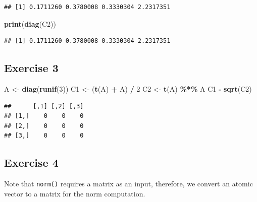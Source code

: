 \documentclass[
]{book}
\newenvironment{Shaded}{\begin{snugshade}}{\end{snugshade}}
\newcommand{\DecValTok}[1]{\textcolor[rgb]{0.00,0.00,0.81}{#1}}
\newcommand{\KeywordTok}[1]{\textcolor[rgb]{0.13,0.29,0.53}{\textbf{#1}}}
\newcommand{\NormalTok}[1]{#1}
\newcommand{\OperatorTok}[1]{\textcolor[rgb]{0.81,0.36,0.00}{\textbf{#1}}}
\newcommand{\StringTok}[1]{\textcolor[rgb]{0.31,0.60,0.02}{#1}}
\begin{document}
\begin{verbatim}
## [1] 0.1711260 0.3780008 0.3330304 2.2317351
\end{verbatim}

\begin{Shaded}
\begin{Highlighting}[]
\KeywordTok{print}\NormalTok{(}\KeywordTok{diag}\NormalTok{(C2))}
\end{Highlighting}
\end{Shaded}

\begin{verbatim}
## [1] 0.1711260 0.3780008 0.3330304 2.2317351
\end{verbatim}

\hypertarget{exercise-3-2}{%
\subsection*{Exercise 3}\label{exercise-3-2}}

\begin{Shaded}
\begin{Highlighting}[]
\NormalTok{A \textless{}{-}}\StringTok{ }\KeywordTok{diag}\NormalTok{(}\KeywordTok{runif}\NormalTok{(}\DecValTok{3}\NormalTok{))}
\NormalTok{C1 \textless{}{-}}\StringTok{ }\NormalTok{(}\KeywordTok{t}\NormalTok{(A) }\OperatorTok{+}\StringTok{ }\NormalTok{A) }\OperatorTok{/}\StringTok{ }\DecValTok{2}
\NormalTok{C2 \textless{}{-}}\StringTok{ }\KeywordTok{t}\NormalTok{(A) }\OperatorTok{\%*\%}\StringTok{ }\NormalTok{A}
\NormalTok{C1 }\OperatorTok{{-}}\StringTok{ }\KeywordTok{sqrt}\NormalTok{(C2)}
\end{Highlighting}
\end{Shaded}

\begin{verbatim}
##      [,1] [,2] [,3]
## [1,]    0    0    0
## [2,]    0    0    0
## [3,]    0    0    0
\end{verbatim}

\hypertarget{exercise-4}{%
\subsection*{Exercise 4}\label{exercise-4}}

Note that \texttt{norm()} requires a matrix as an input, therefore, we convert an atomic vector to a matrix for the norm computation.
\end{document}
